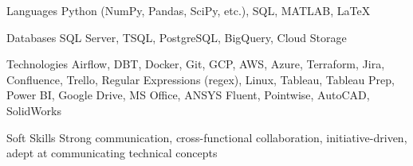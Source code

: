 
\begin{cvskills}
  \cvskill
    {Languages} %
    {Python (NumPy, Pandas, SciPy, etc.), SQL, MATLAB, LaTeX} %
  
  \cvskill
    {Databases} %
    {SQL Server, TSQL, PostgreSQL, BigQuery, Cloud Storage} %
    
  \cvskill
    {Technologies} %
    {Airflow, DBT, Docker, Git, GCP, AWS, Azure, Terraform, Jira, Confluence, Trello, Regular Expressions (regex), Linux, Tableau, Tableau Prep, Power BI, Google Drive, MS Office, ANSYS Fluent, Pointwise, AutoCAD, SolidWorks} %
    
  \cvskill
    {Soft Skills} %
    {Strong communication, cross-functional collaboration, initiative-driven, adept at communicating technical concepts}

\end{cvskills}
